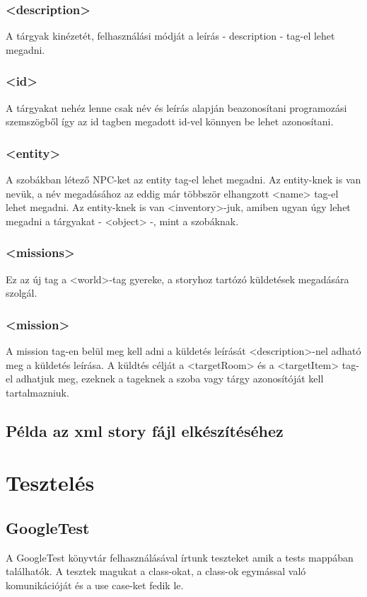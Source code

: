 \documentclass{scrarticle}
\begin{document}
\subsubsection{<description>}
A tárgyak kinézetét, felhasználási módját a leírás - description - tag-el lehet megadni.

\subsubsection{<id>}
A tárgyakat nehéz lenne csak név és leírás alapján beazonosítani programozási szemszögből így az id tagben megadott id-vel könnyen be lehet azonosítani.

\subsubsection{<entity>}
A szobákban létező NPC-ket az entity tag-el lehet megadni. Az entity-knek is van nevük, a név megadásához az eddig már többször elhangzott <name> tag-el lehet megadni. Az entity-knek is van <inventory>-juk, amiben ugyan úgy lehet megadni a tárgyakat - <object> -, mint a szobáknak.

\subsubsection{<missions>}
Ez az új tag a <world>-tag gyereke, a storyhoz tartózó küldetések megadására szolgál.

\subsubsection{<mission>}
A mission tag-en belül meg kell adni a küldetés leírását <description>-nel adható meg a küldetés leírása. A küldtés célját a <targetRoom> és a <targetItem> tag-el adhatjuk meg, ezeknek a tageknek a szoba vagy tárgy azonosítóját kell tartalmazniuk.

\subsection{Példa az xml story fájl elkészítéséhez}


\newpage
\section{Tesztelés}
\subsection{GoogleTest}
A GoogleTest könyvtár felhasználásával írtunk teszteket amik a tests mappában találhatók. A tesztek magukat a class-okat, a class-ok egymással való komunikációját és a use case-ket fedik le.
\end{document}
